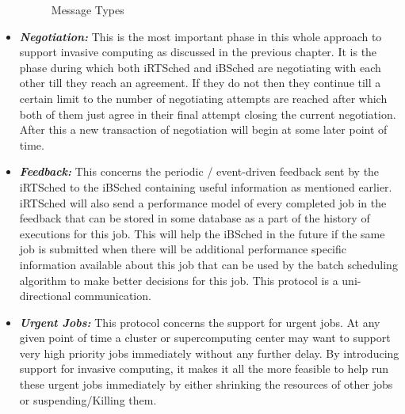 \begin{itemize}
\begin{figure}[h]
\caption{Message Types}
\label{fig:8}
\end{figure}
\item \textbf{\textit{Negotiation:}} This is the most important phase in this whole approach to support invasive computing as discussed in the previous chapter. It is the phase during which both iRTSched and iBSched are negotiating with each other till they reach an agreement. If they do not then they continue till a certain limit to the number of negotiating attempts are reached after which both of them just agree in their final attempt closing the current negotiation. After this a new transaction of negotiation will begin at some later point of time.
\item \textbf{\textit{Feedback:}} This concerns the periodic / event-driven feedback sent by the iRTSched to the iBSched containing useful information as mentioned earlier. iRTSched will also send a performance model of every completed job in the feedback that can be stored in some database as a part of the history of executions for this job. This will help the iBSched in the future if the same job is submitted when there will be additional performance specific information available about this job that can be used by the batch scheduling algorithm to make better decisions for this job. This protocol is a uni-directional communication.
\item \textbf{\textit{Urgent Jobs:}} This protocol concerns the support for urgent jobs. At any given point of time a cluster or supercomputing center may want to support very high priority jobs immediately without any further delay. By introducing support for invasive computing, it makes it all the more feasible to help run these urgent jobs immediately by either shrinking the resources of other jobs or suspending/Killing them.
\end{itemize}
